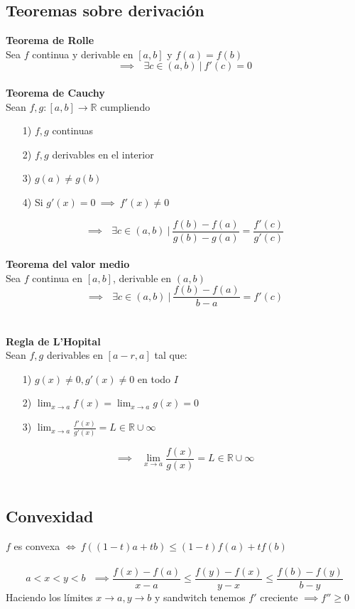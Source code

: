 \documentclass[12pt]{article}
\theoremstyle{plain}
\theoremstyle{definition}
\theoremstyle{remark}
\begin{document}
	\subsection{Teoremas sobre derivación}
	\textbf{Teorema de Rolle}\\
	Sea $f$ continua y derivable en $[a,b]$ y $f(a)=f(b)$
	\[\implies \ \ \ \exists c \in (a,b) \ | \ f'(c)=0\] \\
	\textbf{Teorema de Cauchy} \\
	Sean $f, g: [a,b] \to \mathbb{R}$ cumpliendo
	\begin{itemize}
		\item[1)] $f,g$ continuas
		\item[2)] $f,g$ derivables en el interior
		\item[3)] $g(a)\neq g(b)$
		\item[4)] Si $g'(x)=0\ \implies \ f'(x)\neq 0$
	\end{itemize}
	\[\implies \ \ \ \exists c \in (a,b) \ | \ \frac{f(b)-f(a)}{g(b)-g(a)}=\frac{f'(c)}{g'(c)}\] \\	
	\textbf{Teorema del valor medio}\\
	Sea $f$ continua en $[a,b]$, derivable en $(a,b)$
	\[\implies \ \ \ \exists c \in (a,b) \ | \ \frac{f(b)-f(a)}{b-a}=f'(c)\]\\
	\\
	\textbf{Regla de L'Hopital}\\
	Sean $f, g$ derivables en $[a-r,a]$ tal que:
	\begin{itemize}
		\item[1)] $g(x)\neq 0, g'(x)\neq 0$ en todo $I$
		\item[2)] $\lim_{x\to a}{f(x)}=\lim_{x\to a}{g(x)}=0$
		\item[3)] $\lim_{x\to a}{\frac{f'(x)}{g'(x)}}=L\in \mathbb{R}\cup \infty$		
	\end{itemize}
	\[\implies \ \ \ \lim_{x\to a}{\frac{f(x)}{g(x)}}=L\in \mathbb{R}\cup \infty\] \\
	\subsection{Convexidad}
	$f$ es convexa $\iff \ f((1-t)a+tb)\leq (1-t)f(a)+tf(b)$\\
	\\
	\[a<x<y<b \ \ \ \implies \frac{f(x)-f(a)}{x-a}\leq \frac{f(y)-f(x)}{y-x}\leq \frac{f(b)-f(y)}{b-y}\]
	Haciendo los límites $x\to a, y\to b$ y sandwitch tenemos $f'$ creciente $\implies f''\geq 0$
	
\end{document}
